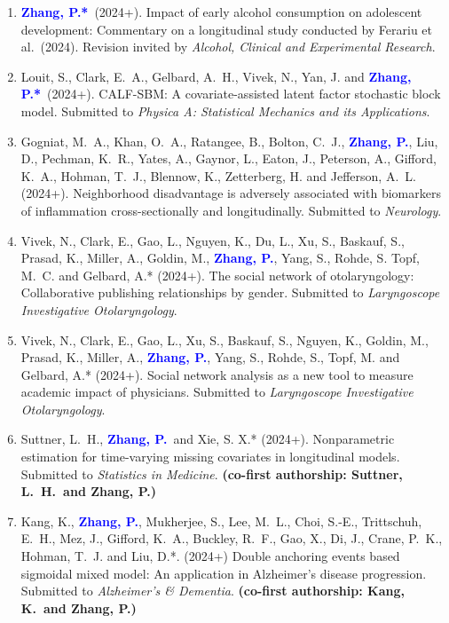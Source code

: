 \documentclass[12pt]{article}
\newcommand{\PZ}{\textcolor{blue}{\textbf{Zhang, P.*}}}
\newcommand{\PZnot}{\textcolor{blue}{\textbf{Zhang, P.}}}
\begin{document}
	\begin{enumerate}	
		\item \PZ\ (2024+). Impact of early alcohol consumption on 
		adolescent development: Commentary on a longitudinal study 
		conducted by Ferariu et al.\ (2024). Revision invited by 
		{\em Alcohol, Clinical and Experimental Research}.
		
		\item {\sc Louit, S., Clark, E.\ A., Gelbard, A.\ H., Vivek, 
		N., Yan, J.} and \PZ\ (2024+). CALF-SBM: A 
		covariate-assisted latent factor stochastic block model. 
		Submitted to {\em Physica A: Statistical Mechanics and its 
		Applications}.
		
		\item {\sc Gogniat, M.\ A., Khan, O.\ A., Ratangee, B., 
		Bolton, C.\ J.,} \PZnot, {\sc Liu, D., Pechman, K.\ R., 
		Yates, A., Gaynor, L., Eaton, J., Peterson, A., Gifford, K.\ 
		A., Hohman, T.\ J., Blennow, K., Zetterberg, H.} and {\sc 
		Jefferson, A.\ L.} (2024+). Neighborhood disadvantage is 
		adversely associated with biomarkers of inflammation 
		cross-sectionally and longitudinally. Submitted to {\em 
		Neurology}.
		
		\item {\sc Vivek, N., Clark, E., Gao, L., Nguyen, K., Du, 
		L., Xu, S., Baskauf, S., Prasad, K., Miller, A., Goldin, 
		M.,} \PZnot, {\sc Yang, S., Rohde, S. Topf, M.\ C.} and {\sc 
		Gelbard, A.*} (2024+). The social network of otolaryngology: 
		Collaborative publishing relationships by gender. Submitted 
		to {\em Laryngoscope Investigative Otolaryngology}.
		
		\item {\sc Vivek, N., Clark, E., Gao, L., Xu, S., Baskauf, 
		S., Nguyen, K., Goldin, M., Prasad, K., Miller, A.,} \PZnot, 
		{\sc Yang, S., Rohde, S., Topf, M.} and {\sc Gelbard, A.*} 
		(2024+). Social network analysis as a new tool to measure 
		academic impact of physicians. Submitted to {\em 
		Laryngoscope Investigative Otolaryngology}.
					
		\item {\sc Suttner, L.\ H.,} \PZnot\ and {\sc Xie, S. X.*} 
		(2024+). Nonparametric estimation for time-varying missing 
		covariates in longitudinal models. Submitted to {\em 
		Statistics in Medicine}. {\bf (co-first authorship: Suttner, 
		L.\ H.\ and Zhang, P.)}
	
		\item {\sc Kang, K.}, \PZnot, {\sc Mukherjee, S., Lee, M.\ 
		L., Choi, S.-E., Trittschuh, E.\ H., Mez, J., Gifford, K.\ 
		A., Buckley, R.\ F., Gao, X., Di, J., Crane, P.\ K., Hohman, 
		T.\ J.} and {\sc Liu, D.*}. (2024+) Double anchoring events 
		based sigmoidal mixed model: An application in Alzheimer's 
		disease progression. Submitted to {\em Alzheimer's \& 
		Dementia}. {\bf (co-first authorship: Kang, K.\ and Zhang, 
		P.)}
		

\end{enumerate}
\end{document}
